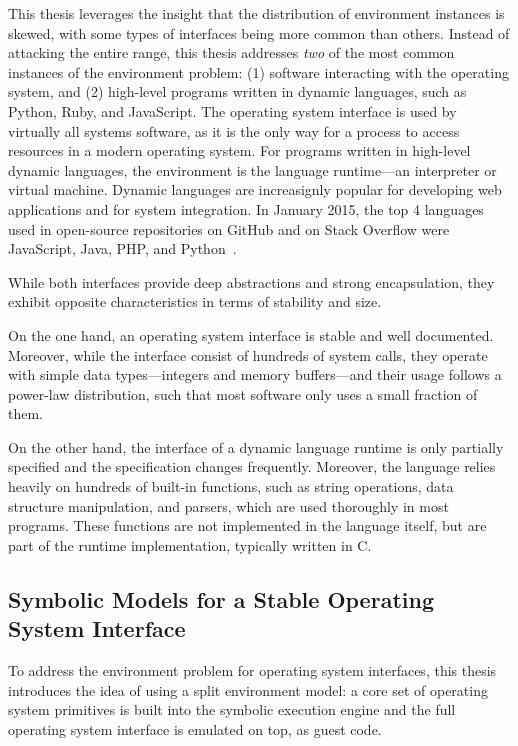 This thesis leverages the insight that the distribution of environment instances is skewed, with some types of interfaces being more common than others.
%
Instead of attacking the entire range, this thesis addresses \emph{two} of the most common instances of the environment problem:  (1) software interacting with the operating system, and (2) high-level programs written in dynamic languages, such as Python, Ruby, and JavaScript.
%
The operating system interface is used by virtually all systems software, as it is the only way for a process to access resources in a modern operating system.
%
For programs written in high-level dynamic languages, the environment is the language runtime---an interpreter or virtual machine.  Dynamic languages are increasignly popular for developing web applications and for system integration.  In January 2015, the top 4 languages used in open-source repositories on GitHub and on Stack Overflow were JavaScript, Java, PHP, and Python~\cite{lang-stats-2015}.

While both interfaces provide deep abstractions and strong encapsulation, they exhibit opposite characteristics in terms of stability and size.

On the one hand, an operating system interface is stable and well documented.
%
Moreover, while the interface consist of hundreds of system calls, they operate with simple data types---integers and memory buffers---and their usage follows a power-law distribution, such that most software only uses a small fraction of them.

On the other hand, the interface of a dynamic language runtime is only partially specified and the specification changes frequently.
%
Moreover, the language relies heavily on hundreds of built-in functions, such as string operations, data structure manipulation, and parsers, which are used thoroughly in most programs.
%
These functions are not implemented in the language itself, but are part of the runtime implementation, typically written in C.


\subsection{Symbolic Models for a Stable Operating System Interface}

To address the environment problem for operating system interfaces, this thesis introduces the idea of using a split environment model:
%
a core set of operating system primitives is built into the symbolic execution engine and the full operating system interface is emulated on top, as guest code.

